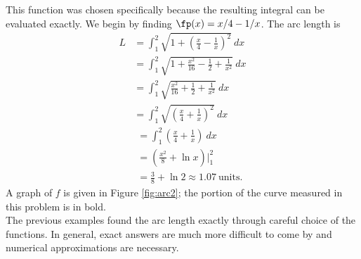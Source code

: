 {This function was chosen specifically because the resulting integral can be evaluated exactly. We begin by finding $\fp(x) = x/4-1/x$. The arc length is 
\begin{align*}
L		&=  \int_1^2 \sqrt{1+ \left(\frac x4-\frac1x\right)^2}\ dx \\
		&= 	\int_1^2 \sqrt{1 + \frac{x^2}{16} -\frac12 + \frac1{x^2} } \ dx \\
		&=	\int_1^2 \sqrt{\frac{x^2}{16} +\frac12 + \frac1{x^2} } \ dx \\
		&=	\int_1^2	\sqrt{ \left(\frac x4 + \frac1x\right)^2}\ dx 
\end{align*}
\begin{align*}
\phantom{L}
				&= \int_1^2 \left(\frac x4 + \frac1x\right) \ dx \\
		&=  \left(\frac{x^2}8 + \ln x\right)\Bigg|_1^2\\
		&=	\frac38+\ln 2 \approx 1.07 \ \text{units}.
\end{align*}
A graph of $f$ is given in Figure \ref{fig:arc2}; the portion of the curve measured in this problem is in bold.
}\\

The previous examples found the arc length exactly through careful choice of the functions. In general, exact answers are much more difficult to come by and numerical approximations are necessary. \\

